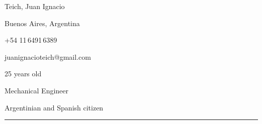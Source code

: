 \documentclass[a4paper,10pt]{article}
\newlength{\cvcolumngapwidth}
\newlength{\cvleftcolumnwidth}
\newlength{\cvrightcolumnwidth}
\newcommand{\cvnamestyle}[1]{{\Large\cvnamefont\textcolor{cvnamecolor}{#1}}}
\newcommand{\cvsectionstyle}[1]{{\normalsize\cvsectionfont\textcolor{cvsectioncolor}{#1}}}
\newlength{\cvafteritemskipamount}
\newlength{\cvaftersectionskipamount}
\newlength{\cvafternameskipamount}
\newlength{\cvafterpersonalinfolineskipamount}
\newcommand{\cvpersonalinfo}[2]{
    \begin{minipage}[t]{\cvleftcolumnwidth}
        \vspace{0mm} %
        \raggedleft #1
    \end{minipage}%
    \hspace{\cvcolumngapwidth}%
    \begin{minipage}[t]{\cvrightcolumnwidth}
        \vspace{0mm} %
        #2
    \end{minipage}

    \vspace{\cvafteritemskipamount}
}
\newcommand{\cvname}[1]{
    \cvnamestyle{#1}

    \vspace{\cvafternameskipamount}
}
\newcommand{\cvpersonalinfolinewithiconsvg}[3]{
    \raisebox{.5\fontcharht\font`E-.5\height}{}
    #3

    \vspace{\cvafterpersonalinfolineskipamount}
}
\newcommand{\cvsection}[1]{
    \begin{minipage}[t]{\cvleftcolumnwidth}
        \raggedleft\cvsectionstyle{#1}
    \end{minipage}%
    \hspace{\cvcolumngapwidth}%
    \begin{minipage}[t]{\cvrightcolumnwidth}
        \textcolor{cvrulecolor}{\rule{\cvrightcolumnwidth}{0.3mm}}
    \end{minipage}

    \vspace{\cvaftersectionskipamount}
}
\begin{document}

\cvpersonalinfo{
    \hspace{7cm}
}{
    \cvname{Teich, Juan Ignacio}

    \begin{minipage}{.5\linewidth}
        \cvpersonalinfolinewithiconsvg{height=4mm}{../../../../logos-photos/location-dot-solid.svg}{
           Buenos Aires, Argentina
        }

        \cvpersonalinfolinewithiconsvg{height=4mm}{../../../../logos-photos/phone-solid.svg}{
            +54 11\,6491\,6389
        }

        \cvpersonalinfolinewithiconsvg{height=3mm}{../../../../logos-photos/envelope-solid.svg}{
            juanignacioteich@gmail.com
        }
    \end{minipage}
    \begin{minipage}{.5\linewidth}
        \cvpersonalinfolinewithiconsvg{height=4mm}{../../../../logos-photos/calendar-days-solid.svg}{
            25 years old
        }

        \cvpersonalinfolinewithiconsvg{height=4mm}{../../../../logos-photos/gear-solid.svg}{
            Mechanical Engineer 
        }

        \cvpersonalinfolinewithiconsvg{height=4mm}{../../../../logos-photos/flag-solid.svg}{
            Argentinian and Spanish citizen 
        }
    \end{minipage}



}


\cvsection{PROFESSIONAL OBJECTIVES}
\end{document}

